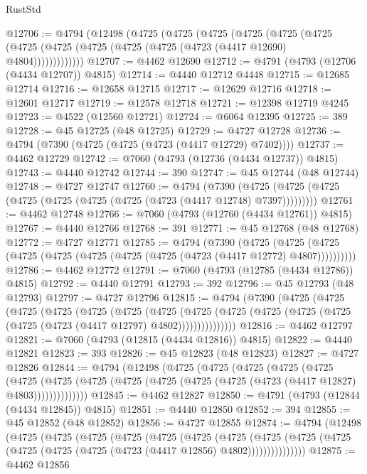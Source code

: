 \begin{lexlean}{RustStd}
\begin{coremodule}
@12706 := @4794
    (@12498
      (@4725
        (@4725
          (@4725
            (@4725
              (@4725
                (@4725 (@4725 (@4725 (@4725 (@4725 (@4725 (@4723 (@4417 @12690) @4804)))))))))))))
@12707 := @4462 @12690
@12712 := @4791 (@4793 (@12706 (@4434 @12707)) @4815)
@12714 := @4440 @12712 @4448
@12715 := @12685 @12714
@12716 := @12658 @12715
@12717 := @12629 @12716
@12718 := @12601 @12717
@12719 := @12578 @12718
@12721 := @12398 @12719 @4245
@12723 := @4522 (@12560 @12721)
@12724 := @6064 @12395
@12725 := 389
@12728 := @45 @12725 (@48 @12725)
@12729 := @4727 @12728
@12736 := @4794 (@7390 (@4725 (@4725 (@4723 (@4417 @12729) @7402))))
@12737 := @4462 @12729
@12742 := @7060 (@4793 (@12736 (@4434 @12737)) @4815)
@12743 := @4440 @12742
@12744 := 390
@12747 := @45 @12744 (@48 @12744)
@12748 := @4727 @12747
@12760 := @4794
    (@7390 (@4725 (@4725 (@4725 (@4725 (@4725 (@4725 (@4725 (@4723 (@4417 @12748) @7397)))))))))
@12761 := @4462 @12748
@12766 := @7060 (@4793 (@12760 (@4434 @12761)) @4815)
@12767 := @4440 @12766
@12768 := 391
@12771 := @45 @12768 (@48 @12768)
@12772 := @4727 @12771
@12785 := @4794
    (@7390
      (@4725 (@4725 (@4725 (@4725 (@4725 (@4725 (@4725 (@4725 (@4723 (@4417 @12772) @4807))))))))))
@12786 := @4462 @12772
@12791 := @7060 (@4793 (@12785 (@4434 @12786)) @4815)
@12792 := @4440 @12791
@12793 := 392
@12796 := @45 @12793 (@48 @12793)
@12797 := @4727 @12796
@12815 := @4794
    (@7390
      (@4725
        (@4725
          (@4725
            (@4725
              (@4725
                (@4725
                  (@4725
                    (@4725
                      (@4725 (@4725 (@4725 (@4725 (@4725 (@4723 (@4417 @12797) @4802)))))))))))))))
@12816 := @4462 @12797
@12821 := @7060 (@4793 (@12815 (@4434 @12816)) @4815)
@12822 := @4440 @12821
@12823 := 393
@12826 := @45 @12823 (@48 @12823)
@12827 := @4727 @12826
@12844 := @4794
    (@12498
      (@4725
        (@4725
          (@4725
            (@4725
              (@4725
                (@4725
                  (@4725
                    (@4725 (@4725 (@4725 (@4725 (@4725 (@4723 (@4417 @12827) @4803))))))))))))))
@12845 := @4462 @12827
@12850 := @4791 (@4793 (@12844 (@4434 @12845)) @4815)
@12851 := @4440 @12850
@12852 := 394
@12855 := @45 @12852 (@48 @12852)
@12856 := @4727 @12855
@12874 := @4794
    (@12498
      (@4725
        (@4725
          (@4725
            (@4725
              (@4725
                (@4725
                  (@4725
                    (@4725
                      (@4725 (@4725 (@4725 (@4725 (@4725 (@4723 (@4417 @12856) @4802)))))))))))))))
@12875 := @4462 @12856

\end{coremodule}
\end{lexlean}
